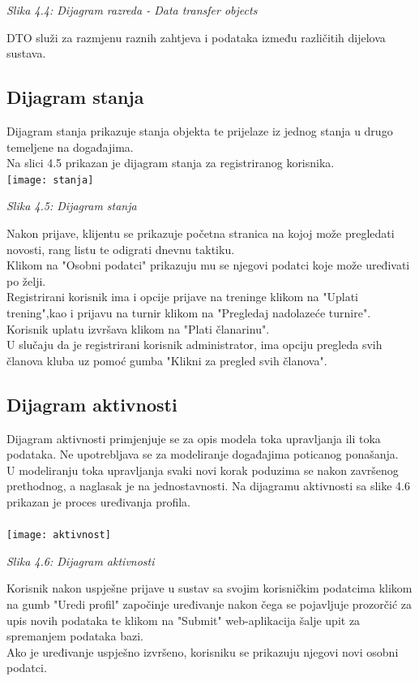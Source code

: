 \documentclass{article}
\begin{document}
	\begin{center}
		\textit{Slika 4.4: Dijagram razreda - Data transfer objects}
	\end{center}
	DTO služi za razmjenu raznih zahtjeva i podataka između različitih dijelova sustava.
	
	\eject
	\subsection{Dijagram stanja}
	Dijagram stanja prikazuje stanja objekta te prijelaze iz jednog stanja u drugo temeljene na događajima. \\
	Na slici 4.5 prikazan je dijagram stanja za registriranog korisnika. \\
	\texttt{[image: stanja]}
	\begin{center}
		\textit{Slika 4.5: Dijagram stanja}
	\end{center}
	Nakon prijave, klijentu se prikazuje početna stranica na kojoj može pregledati novosti, rang listu te odigrati dnevnu taktiku.\\
	Klikom na "Osobni podatci" prikazuju mu se njegovi podatci koje može uređivati po želji.\\
	Registrirani korisnik ima i opcije prijave na treninge klikom na "Uplati\\ trening",kao i prijavu na turnir klikom na "Pregledaj nadolazeće turnire".
	Korisnik uplatu izvršava klikom na "Plati članarinu". \\
	U slučaju da je registrirani korisnik administrator, ima opciju pregleda svih članova kluba uz pomoć gumba "Klikni za pregled svih članova".
	\eject
	\subsection{Dijagram aktivnosti}
	Dijagram aktivnosti primjenjuje se za opis modela toka upravljanja ili toka podataka. Ne upotrebljava se za modeliranje događajima poticanog ponašanja.\\ 
	U modeliranju toka upravljanja svaki novi korak poduzima se nakon završenog prethodnog, a naglasak je na jednostavnosti. Na dijagramu aktivnosti sa slike 4.6 prikazan je proces uređivanja profila.\\
	\\
	\texttt{[image: aktivnost]}
	\begin{center}
		\textit{Slika 4.6: Dijagram aktivnosti}
	\end{center}
	Korisnik nakon uspješne prijave u sustav sa svojim korisničkim podatcima klikom na gumb "Uredi profil" započinje uređivanje nakon čega se pojavljuje prozorčić za upis novih podataka te klikom na "Submit" web-aplikacija šalje upit za spremanjem podataka bazi.\\
	Ako je uređivanje uspješno izvršeno, korisniku se prikazuju njegovi novi osobni podatci.
	\eject
\end{document}
